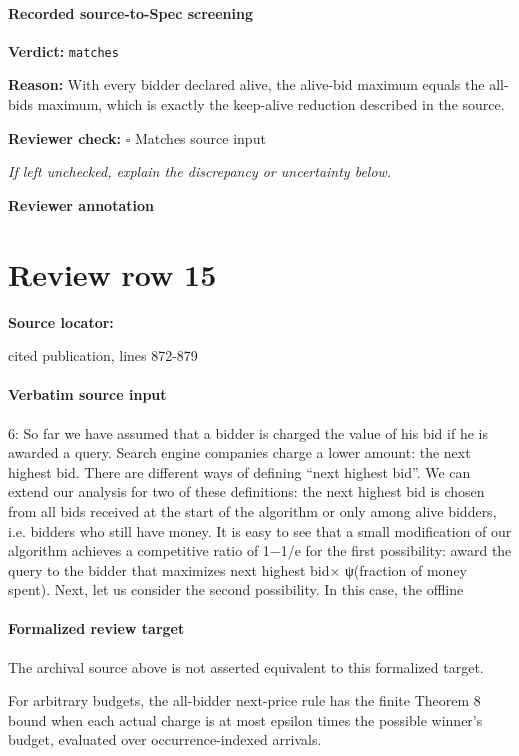 \documentclass[10pt]{article}
\newcommand{\reviewerbox}{%
  \par\noindent\fbox{\parbox{0.96\linewidth}{\rule{0pt}{0.38in}}}\par
}
\newcommand{\reviewmatch}[1]{%
  \par\noindent\textbf{Reviewer check:} $\square$\; #1\par
  \noindent\emph{If left unchecked, explain the discrepancy or uncertainty below.}\par
}
\begin{document}
\paragraph{Recorded source-to-Spec screening}
\textbf{Verdict:} \texttt{matches}
\\
{\raggedright
\textbf{Reason:} With every bidder declared alive, the alive-\allowbreak{}bid maximum equals the all-\allowbreak{}bids maximum, which is exactly the keep-\allowbreak{}alive reduction described in the source.\allowbreak{}
\par}
\reviewmatch{Matches source input}
\noindent\textbf{Reviewer annotation}\par
\reviewerbox
\clearpage
\hypertarget{source-claim-d7d8eafafd0843a4}{}
\section*{Review row 15}
\textbf{Source locator:} {\footnotesize\raggedright cited publication, lines 872-\allowbreak{}879\par}
\paragraph{Verbatim source input}
\begin{ReviewVerbatim}
6: So far we have assumed that a bidder is charged the value of his bid if he is awarded a query.
Search engine companies charge a lower amount: the next highest bid. There are different ways
of defining “next highest bid”. We can extend our analysis for two of these definitions: the
next highest bid is chosen from all bids received at the start of the algorithm or only among
alive bidders, i.e. bidders who still have money.
It is easy to see that a small modification of our algorithm achieves a competitive ratio of
1−1/e for the first possibility: award the query to the bidder that maximizes next highest bid×
ψ(fraction of money spent). Next, let us consider the second possibility. In this case, the offline
\end{ReviewVerbatim}


\paragraph{Formalized review target}
The archival source above is not asserted equivalent to this formalized target.
\begin{ReviewVerbatim}
For arbitrary budgets, the all-bidder next-price rule has the finite Theorem 8 bound when each actual charge is at most epsilon times the possible winner's budget, evaluated over occurrence-indexed arrivals.
\end{ReviewVerbatim}
\end{document}
